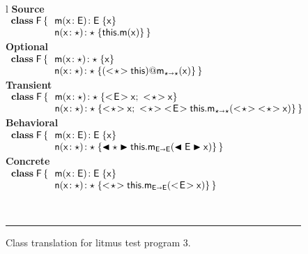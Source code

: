 \documentclass[USenglish]{tex/lipics-v2016}
\begin{document}
\begin{figure}[!h]
\hrulefill\\
  \begin{tabular}{l}
    {\scriptsize\bf{Source}} \\
\(
\begin{array}{l@{\,}l}
\Class{\xt F}{}{&\Mdef\m\x{\xt E}{\xt E}\x \\
                &\Mdef\n\x\any\any{\Call\this\m\x}} \\
\end{array}
\) \\
    {\scriptsize\bf{Optional}} \\ 
\(
\begin{array}{l@{\,}l}
\Class{\xt F}{}{&\Mdef\m\x{\any}{\any}\x \\
                &\Mdef\n\x\any\any{\DynCall{(\SubCast\any\this)}\m\x}} \\
\end{array}
\) \\
    {\scriptsize\bf{Transient}} \\
\(
\begin{array}{l@{\,}l}
\Class{\xt F}{}{&\Mdef\m\x\any\any{\SubCast{\xt E}{\x}; ~ \SubCast{\any}{\x} } \\
                &\Mdef\n\x\any\any{\SubCast{\any}{\x}\sspce 
                \SubCast{\any}{\SubCast{\xt E}{\KCall\this\m{\SubCast\any{\SubCast\any\x}}\any\any}}}} \\
\end{array}
\)\\
    {\scriptsize\bf{Behavioral}} \\
\(
\begin{array}{l@{\,}l}
\Class{\xt F}{}{&\Mdef\m\x{\xt E}{\xt E}\x \\
                &\Mdef\n\x\any\any{\BehCast\any{\KCall\this\m{\BehCast{\xt E}\x}{\xt E}{\xt E}}}} \\
\end{array}
\) \\
    {\scriptsize\bf{Concrete}} \\
\(
\begin{array}{l@{\,}l}
\Class{\xt F}{}{&\Mdef\m\x{\xt E}{\xt E}\x \\
                &\Mdef\n\x\any\any{\SubCast\any{\KCall\this\m{\SubCast{\xt E}\x}{\xt E}{\xt E}}}} \\
\end{array}
\) \\
  \end{tabular}\vspace{2mm}\\
\hrule\vspace{4mm}

 \caption{Class translation for litmus test program 3.} \label{fig:l3trans}
\end{figure}
\end{document}

